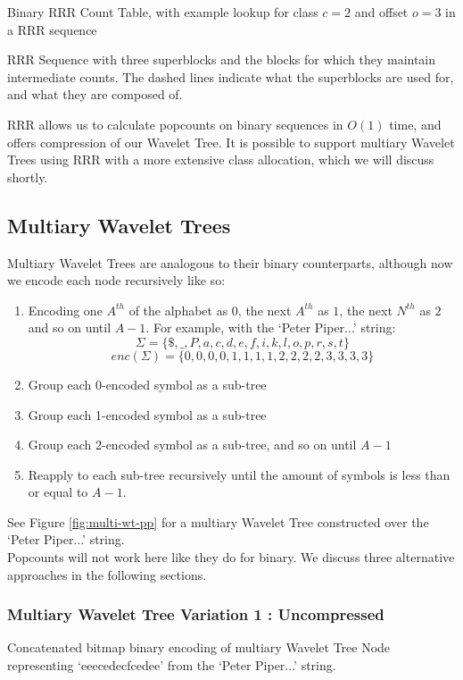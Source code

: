 		{Binary RRR Count Table, with example lookup for class $c = 2$
		and offset $o = 3$ in a RRR sequence}

		{RRR Sequence with three superblocks and the blocks for which they
		maintain intermediate counts. The dashed lines indicate what
		the superblocks are used for, and what they are composed of.}

RRR allows us to calculate popcounts on binary sequences in $O(1)$ time, and 
offers compression of our Wavelet Tree. It is possible to support multiary 
Wavelet Trees using RRR with a more extensive class allocation, which we will 
discuss shortly.

\clearpage
\subsection{Multiary Wavelet Trees}
Multiary Wavelet Trees are analogous to their binary counterparts, although now we encode each node recursively like so:

\begin{enumerate}
    \item Encoding one $A^{th}$ of the alphabet as $0$, the next $A^{th}$ as 
		$1$, the next $N^{th}$ as $2$ and so on until $A-1$. For example, with 
		the `Peter Piper...' string:
		$$\Sigma = \{ \$, \_, P, a, c, d, e, f, i, k, l, o, p, r, s, t \}$$
	   	$$enc(\Sigma) = \{  0,  0, 0, 0, 1, 1, 1, 1, 2, 2, 2, 2, 3, 3, 3, 3 \}$$
    \item Group each 0-encoded symbol as a sub-tree
    \item Group each 1-encoded symbol as a sub-tree
    \item Group each 2-encoded symbol as a sub-tree, and so on until $A-1$
    \item Reapply to each sub-tree recursively until the amount of symbols is
	less than or equal to $A - 1$.
\end{enumerate}

See Figure \ref{fig:multi-wt-pp} for a multiary Wavelet Tree constructed over
the `Peter Piper...' string.\\

Popcounts will not work here like they do for binary. We discuss three 
alternative approaches in the following sections.

\subsubsection{Multiary Wavelet Tree Variation 1 : Uncompressed}
		{Concatenated bitmap binary encoding of multiary Wavelet Tree Node
		representing `eeecedecfcedee' from the `Peter Piper...' string.}
		

